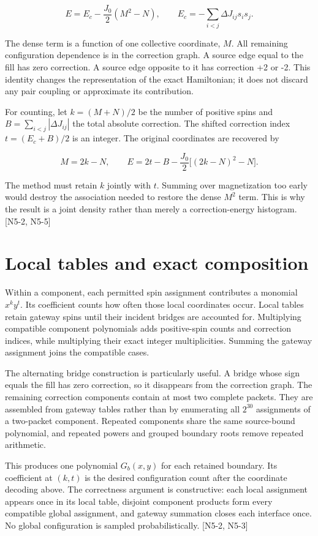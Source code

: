 \[E=E_c-\frac{J_0}{2}(M^2-N),\qquad E_c=-\sum_{i<j}\Delta J_{ij}s_i s_j.\]

The dense term is a function of one collective coordinate, \(M\). All remaining configuration dependence is in the correction graph. A source edge equal to the fill has zero correction. A source edge opposite to it has correction +2 or -2. This identity changes the representation of the exact Hamiltonian; it does not discard any pair coupling or approximate its contribution.

For counting, let \(k=(M+N)/2\) be the number of positive spins and \(B=\sum_{i<j}|\Delta J_{ij}|\) the total absolute correction. The shifted correction index \(t=(E_c+B)/2\) is an integer. The original coordinates are recovered by

\[M=2k-N,\qquad E=2t-B-\frac{J_0}{2}\bigl[(2k-N)^2-N\bigr].\]

The method must retain \(k\) jointly with \(t\). Summing over magnetization too early would destroy the association needed to restore the dense \(M^2\) term. This is why the result is a joint density rather than merely a correction-energy histogram. {[}N5-2, N5-5{]}

\section{Local tables and exact composition}\label{local-tables-and-exact-composition}

Within a component, each permitted spin assignment contributes a monomial \(x^k y^t\). Its coefficient counts how often those local coordinates occur. Local tables retain gateway spins until their incident bridges are accounted for. Multiplying compatible component polynomials adds positive-spin counts and correction indices, while multiplying their exact integer multiplicities. Summing the gateway assignment joins the compatible cases.

The alternating bridge construction is particularly useful. A bridge whose sign equals the fill has zero correction, so it disappears from the correction graph. The remaining correction components contain at most two complete packets. They are assembled from gateway tables rather than by enumerating all \(2^{30}\) assignments of a two-packet component. Repeated components share the same source-bound polynomial, and repeated powers and grouped boundary roots remove repeated arithmetic.

This produces one polynomial \(G_b(x,y)\) for each retained boundary. Its coefficient at \((k,t)\) is the desired configuration count after the coordinate decoding above. The correctness argument is constructive: each local assignment appears once in its local table, disjoint component products form every compatible global assignment, and gateway summation closes each interface once. No global configuration is sampled probabilistically. {[}N5-2, N5-3{]}

